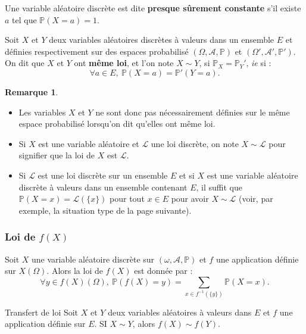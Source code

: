 \documentclass[french]{article}
\renewcommand{\P}{\mathbb{P}}
\newcommand{\inv}{^{-1}}
\theoremstyle{plain}
\theoremstyle{definition}
\newtheorem*{rmq}{Remarque}
\theoremstyle{remark}
\begin{document}
\begin{dfn}
	Une variable aléatoire discrète est dite \textbf{presque sûrement constante} s'il existe $a$ tel que $\P(X=a)=1$.
\end{dfn}

\begin{dfn}
	Soit $X$ et $Y$ deux variables aléatoires discrètes à valeurs dans un ensemble $E$ et définies respectivement sur des espaces probabilisé $(\Omega,\mathcal{A},\P)$ et $(\Omega',\mathcal{A}',\P')$.\\
	On dit que $X$ et $Y$ ont \textbf{même loi}, et l'on note $X\sim Y$, si $\P_X=\P_Y'$, \textit{ie} si :
	$$\forall a\in E,\ \P(X=a)=\P'(Y=a).$$
\end{dfn}

\begin{rmq}
	\begin{itemize}
		\item Les variables $X$ et $Y$ ne sont donc pas nécessairement définies sur le même espace probabilisé lorsqu'on dit qu'elles ont même loi.
		\item Si $X$ est une variable aléatoire et $\mathcal{L}$ une loi discrète, on note $X\sim\mathcal{L}$ pour signifier que la loi de $X$ est $\mathcal{L}$.
		\item Si $\mathcal{L}$ est une loi discrète sur un ensemble $E$ et si $X$ est une variable aléatoire discrète à valeurs dans un ensemble contenant $E$, il suffit que $\P(X=x)=\mathcal{L}(\{x\})$ pour tout $x\in E$ pour avoir $X\sim\mathcal{L}$ (voir, par exemple, la situation type de la page suivante).
	\end{itemize}
\end{rmq}

\subsubsection*{Loi de $f(X)$}

\begin{thm}{}%
	Soit $X$ une variable aléatoire discrète sur $(\omega,\mathcal{A},\P)$ et $f$ une application définie sur $X(\Omega)$. Alors la loi de $f(X)$ est donnée par :
	$$\forall y\in f(X)(\Omega),\ \P(f(X)=y)=\sum_{x\in f\inv(\{y\})}\P(X=x).$$
\end{thm}

\begin{thm}{Transfert de loi}%
	Soit $X$ et $Y$ deux variables aléatoires à valeurs dans $E$ et $f$ une application définie sur $E$. SI $X\sim Y$, alors $f(X)\sim f(Y)$.
\end{thm}
\end{document}
